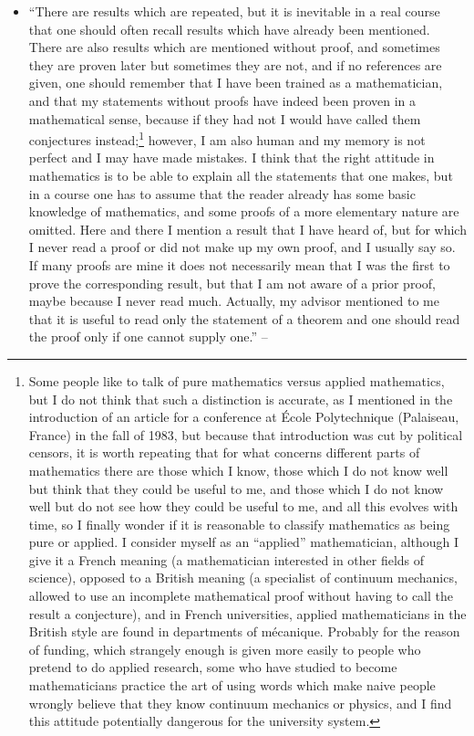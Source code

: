 \documentclass[oneside]{book}
\numberwithin{equation}{section}
\begin{document}
\begin{enumerate}
\begin{itemize}
		\item ``There are results which are repeated, but it is inevitable in a real course that one should often recall results which have already been mentioned. There are also results which are mentioned without proof, and sometimes they are proven later but sometimes they are not, and if no references are given, one should remember that I have been trained as a mathematician, and that my statements without proofs have indeed been proven in a mathematical sense, because if they had not I would have called them conjectures instead;\footnote{Some people like to talk of pure mathematics versus applied mathematics, but I do not think that such a distinction is accurate, as I mentioned in the introduction of an article for a conference at \'Ecole Polytechnique (Palaiseau, France) in the fall of 1983, but because that introduction was cut by political censors, it is worth repeating that for what concerns different parts of mathematics there are those which I know, those which I do not know well but think that they could be useful to me, and those which I do not know well but do not see how they could be useful to me, and all this evolves with time, so I finally wonder if it is reasonable to classify mathematics as being pure or applied. I consider myself as an ``applied'' mathematician, although I give it a French meaning (a mathematician interested in other fields of science), opposed to a British meaning (a specialist of continuum mechanics, allowed to use an incomplete mathematical proof without having to call the result a conjecture), and in French universities, applied mathematicians in the British style are found in departments of m\'ecanique. Probably for the reason of funding, which strangely enough is given more easily to people who pretend to do applied research, some who have studied to become mathematicians practice the art of using words which make naive people wrongly believe that they know continuum mechanics or physics, and I find this attitude potentially dangerous for the university system.} however, I am also human and my memory is not perfect and I may have made mistakes. I think that the right attitude in mathematics is to be able to explain all the statements that one makes, but in a course one has to assume that the reader already has some basic knowledge of mathematics, and some proofs of a more elementary nature are omitted. Here and there I mention a result that I have heard of, but for which I never read a proof or did not make up my own proof, and I usually say so. If many proofs are mine it does not necessarily mean that I was the first to prove the corresponding result, but that I am not aware of a prior proof, maybe because I never read much. Actually, my advisor mentioned to me that it is useful to read only the statement of a theorem and one should read the proof only if one cannot supply one.'' -- \cite[Preface, pp. xii--xiii]{Tartar2006}

\end{itemize}
\end{enumerate}
\end{document}
